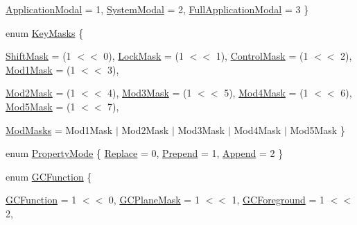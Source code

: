 \begin{DoxyCompactItemize}
\hyperlink{namespace_tao_1_1_platform_1_1_x11_a8e24898f5a03698d6c8a39da5b2e88b6}{ApplicationModal} =  1, 
\hyperlink{namespace_tao_1_1_platform_1_1_x11_a8e24898f5a03698d6c8a39da5b2e88b6}{SystemModal} =  2, 
\hyperlink{namespace_tao_1_1_platform_1_1_x11_a8e24898f5a03698d6c8a39da5b2e88b6}{FullApplicationModal} =  3
 \}
\item 
enum \hyperlink{namespace_tao_1_1_platform_1_1_x11_a2b426e7555e31d5d2a5a1cc09013662d}{KeyMasks} \{ \par
\hyperlink{namespace_tao_1_1_platform_1_1_x11_a2b426e7555e31d5d2a5a1cc09013662d}{ShiftMask} =  (1 $<$$<$ 0), 
\hyperlink{namespace_tao_1_1_platform_1_1_x11_a2b426e7555e31d5d2a5a1cc09013662d}{LockMask} =  (1 $<$$<$ 1), 
\hyperlink{namespace_tao_1_1_platform_1_1_x11_a2b426e7555e31d5d2a5a1cc09013662d}{ControlMask} =  (1 $<$$<$ 2), 
\hyperlink{namespace_tao_1_1_platform_1_1_x11_a2b426e7555e31d5d2a5a1cc09013662d}{Mod1Mask} =  (1 $<$$<$ 3), 
\par
\hyperlink{namespace_tao_1_1_platform_1_1_x11_a2b426e7555e31d5d2a5a1cc09013662d}{Mod2Mask} =  (1 $<$$<$ 4), 
\hyperlink{namespace_tao_1_1_platform_1_1_x11_a2b426e7555e31d5d2a5a1cc09013662d}{Mod3Mask} =  (1 $<$$<$ 5), 
\hyperlink{namespace_tao_1_1_platform_1_1_x11_a2b426e7555e31d5d2a5a1cc09013662d}{Mod4Mask} =  (1 $<$$<$ 6), 
\hyperlink{namespace_tao_1_1_platform_1_1_x11_a2b426e7555e31d5d2a5a1cc09013662d}{Mod5Mask} =  (1 $<$$<$ 7), 
\par
\hyperlink{namespace_tao_1_1_platform_1_1_x11_a2b426e7555e31d5d2a5a1cc09013662d}{ModMasks} =  Mod1Mask $|$ Mod2Mask $|$ Mod3Mask $|$ Mod4Mask $|$ Mod5Mask
 \}
\item 
enum \hyperlink{namespace_tao_1_1_platform_1_1_x11_a0b50488fd5af568866df2050b7f45590}{PropertyMode} \{ \hyperlink{namespace_tao_1_1_platform_1_1_x11_a0b50488fd5af568866df2050b7f45590}{Replace} =  0, 
\hyperlink{namespace_tao_1_1_platform_1_1_x11_a0b50488fd5af568866df2050b7f45590}{Prepend} =  1, 
\hyperlink{namespace_tao_1_1_platform_1_1_x11_a0b50488fd5af568866df2050b7f45590}{Append} =  2
 \}
\item 
enum \hyperlink{namespace_tao_1_1_platform_1_1_x11_a30e0aa1faebe781b3f96bd49eab750a4}{GCFunction} \{ \par
\hyperlink{namespace_tao_1_1_platform_1_1_x11_a30e0aa1faebe781b3f96bd49eab750a4}{GCFunction} =  1 $<$$<$ 0, 
\hyperlink{namespace_tao_1_1_platform_1_1_x11_a30e0aa1faebe781b3f96bd49eab750a4}{GCPlaneMask} =  1 $<$$<$ 1, 
\hyperlink{namespace_tao_1_1_platform_1_1_x11_a30e0aa1faebe781b3f96bd49eab750a4}{GCForeground} =  1 $<$$<$ 2, 
$$
\end{DoxyCompactItemize}
